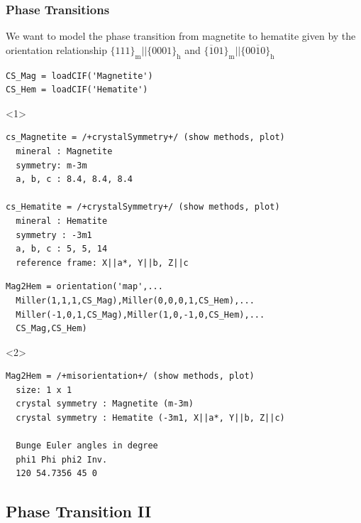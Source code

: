\documentclass[compress]{beamer}
\begin{document}
\begin{frame}[fragile]
  \frametitle{Phase Transitions}

  \begin{overlayarea}{\textwidth}{8cm}
    We want to model the phase transition from magnetite to hematite given by
    the orientation relationship $\{111\}_{\text{m}} || \{0001\}_{\text{h}}$
    and $\{\overline{1}01\}_{\text{m}} || \{00\overline{1}0\}_{\text{h}}$
    \begin{lstlisting}[style=input]
CS_Mag = loadCIF('Magnetite')
CS_Hem = loadCIF('Hematite')
   \end{lstlisting}
   \begin{onlyenv}<1>
     \vspace{-0.3cm}
     \begin{lstlisting}[style=output]
cs_Magnetite = /+crystalSymmetry+/ (show methods, plot)
  mineral : Magnetite
  symmetry: m-3m
  a, b, c : 8.4, 8.4, 8.4

cs_Hematite = /+crystalSymmetry+/ (show methods, plot)
  mineral : Hematite
  symmetry : -3m1
  a, b, c : 5, 5, 14
  reference frame: X||a*, Y||b, Z||c
    \end{lstlisting}
  \end{onlyenv}

  \pause
  \medskip

  \begin{lstlisting}[style=input]
Mag2Hem = orientation('map',...
  Miller(1,1,1,CS_Mag),Miller(0,0,0,1,CS_Hem),...
  Miller(-1,0,1,CS_Mag),Miller(1,0,-1,0,CS_Hem),...
  CS_Mag,CS_Hem)
  \end{lstlisting}
  \begin{onlyenv}<2>
    \vspace{-0.3cm}
    \begin{lstlisting}[style=output]
Mag2Hem = /+misorientation+/ (show methods, plot)
  size: 1 x 1
  crystal symmetry : Magnetite (m-3m)
  crystal symmetry : Hematite (-3m1, X||a*, Y||b, Z||c)

  Bunge Euler angles in degree
  phi1 Phi phi2 Inv.
  120 54.7356 45 0
    \end{lstlisting}
  \end{onlyenv}
\end{overlayarea}
\end{frame}


\subsection*{Phase Transition II}
\end{document}
